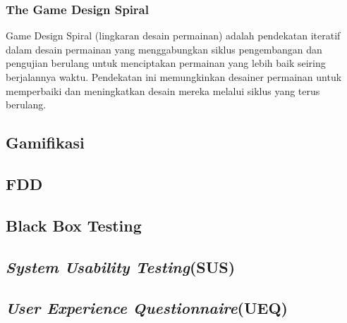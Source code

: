 \subsubsection{The Game Design Spiral}
Game Design Spiral (lingkaran desain permainan) adalah pendekatan iteratif 
dalam desain permainan yang menggabungkan siklus pengembangan dan pengujian berulang untuk menciptakan 
permainan yang lebih baik seiring berjalannya waktu. Pendekatan ini memungkinkan desainer permainan untuk 
memperbaiki dan meningkatkan desain mereka melalui siklus yang terus berulang.
\subsection{Gamifikasi}
\subsection{FDD}
\subsection{Black Box Testing}
\subsection{\textit{System Usability Testing}(SUS)}
\subsection{\textit{User Experience Questionnaire}(UEQ)}




